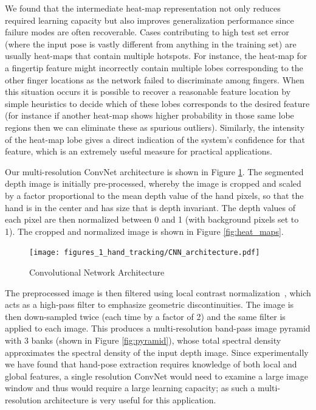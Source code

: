 We found that the intermediate heat-map representation not only reduces required learning capacity but also improves generalization performance since failure modes are often recoverable. Cases contributing to high test set error (where the input pose is vastly different from anything in the training set) are usually heat-maps that contain multiple hotspots. For instance, the heat-map for a fingertip feature might incorrectly contain multiple lobes corresponding to the other finger locations as the network failed to discriminate among fingers. When this situation occurs it is possible to recover a reasonable feature location by simple heuristics to decide which of these lobes corresponds to the desired feature (for instance if another heat-map shows higher probability in those same lobe regions then we can eliminate these as spurious outliers). Similarly, the intensity of the heat-map lobe gives a direct indication of the system's confidence for that feature, which is an extremely useful measure for practical applications.

Our multi-resolution ConvNet architecture is shown in Figure \ref{fig:cnn}. The segmented depth image is initially pre-processed, whereby the image is cropped and scaled by a factor proportional to the mean depth value of the hand pixels, so that the hand is in the center and has size that is depth invariant. The depth values of each pixel are then normalized between 0 and 1 (with background pixels set to 1). The cropped and normalized image is shown in Figure \ref{fig:heat_maps}.

\begin{figure}[ht]
\centering
\texttt{[image: figures\_1\_hand\_tracking/CNN\_architecture.pdf]}
    \caption{Convolutional Network Architecture}
    \label{fig:cnn}
\end{figure}

The preprocessed image is then filtered using local contrast normalization~\cite{JarrettLeCun}, which acts as a high-pass filter to emphasize geometric discontinuities. The image is then down-sampled twice (each time by a factor of 2) and the same filter is applied to each image. This produces a multi-resolution band-pass image pyramid with 3 banks (shown in Figure \ref{fig:pyramid}), whose total spectral density approximates the spectral density of the input depth image. Since experimentally we have found that hand-pose extraction requires knowledge of both local and global features, a single resolution ConvNet would need to examine a large image window and thus would require a large learning capacity; as such a multi-resolution architecture is very useful for this application.

